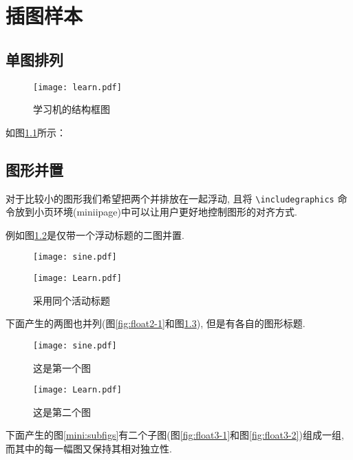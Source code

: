 \chapter{插图样本}
\setcounter{subsubsection}{0} %
\section{单图排列 \label{chap5:figure1}}
\begin{figure}[ht]
\centering
\texttt{[image: learn.pdf]}
\caption{学习机的结构框图} \label{fig:7-1}
\end{figure}
如图\ref{fig:7-1}所示：
\section{图形并置 \label{chap5:figure2}}
对于比较小的图形我们希望把两个并排放在一起浮动, 且将 \verb/\includegraphics/
命令放到小页环境(miniipage)中可以让用户更好地控制图形的对齐方式.

例如图\ref{fig:7-2}是仅带一个浮动标题的二图并置.
\begin{figure}[ht]
  \centering
  \begin{minipage}[c]{0.5\textwidth}
    \centering
    \texttt{[image: sine.pdf]}
  \end{minipage}%
  \begin{minipage}[c]{0.5\textwidth}
    \centering
    \texttt{[image: Learn.pdf]}
  \end{minipage}
  \caption{采用同个活动标题\label{fig:7-2}}
\end{figure}


下面产生的两图也并列(图\ref{fig:float2-1}和图\ref{fig:float2-2}), 但是有各自的图形标题.
\begin{figure}[ht]
\begin{minipage}[t]{0.45\linewidth}
\centering
\texttt{[image: sine.pdf]}
\caption{这是第一个图\label{fig:float2-1}}
\end{minipage}%
\hfill
\begin{minipage}[t]{0.5\linewidth}
\centering
\texttt{[image: Learn.pdf]}
\caption{这是第二个图\label{fig:float2-2}}
\end{minipage}
\end{figure}


下面产生的图\ref{mini:subfigs}有二个子图(图\ref{fig:float3-1}和图\ref{fig:float3-2})组成一组,
而其中的每一幅图又保持其相对独立性.


